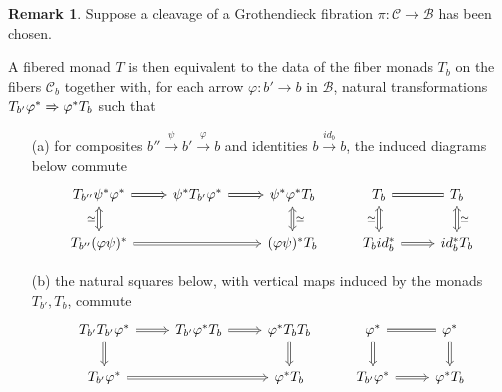 \documentclass[a4paper,10pt
,draft
]{article}%
\numberwithin{equation}{section}
\numberwithin{figure}{section}
\theoremstyle{definition} %
\newtheorem{remark}[equation]{Remark}%
\newcommand{\1}{\ensuremath{\mathbbm 1}}%
\begin{document}
\begin{remark}\label{FIBMONCL REM}
	Suppose a cleavage of a Grothendieck fibration
	$\pi \colon \mathcal{C} \to \mathcal{B}$ 
	has been chosen.
	
	A fibered monad $T$ is then equivalent to the data of the fiber monads 
	$T_b$ on the fibers $\mathcal{C}_b$ together with,
	for each arrow $\varphi \colon b' \to b$ in $\mathcal{B}$,
	natural transformations
	$T_{b'} \varphi^{\**} \Rightarrow \varphi^{\**} T_{b}$
	such that
	\begin{itemize}
		\item[(a)]
		for composites $b'' \xrightarrow{\psi} b' \xrightarrow{\varphi} b$
		and identities $b \xrightarrow{id_b} b$,
		the induced diagrams below commute
		\begin{equation}\label{GROTHASS EQ}
		\begin{tikzcd}
		T_{b''} \psi^{\**} \varphi^{\**} 
		\ar[Rightarrow]{r} \ar[Leftrightarrow]{d}[swap]{\simeq} &
		\psi^{\**} T_{b'} \varphi^{\**} \ar[Rightarrow]{r} &
		\psi^{\**} \varphi^{\**}  T_{b} \ar[Leftrightarrow]{d}{\simeq} &
		T_b \ar[equal]{r} \ar[Leftrightarrow]{d}[swap]{\simeq} &
		T_b \ar[Leftrightarrow]{d}{\simeq}
		\\
		T_{b''} (\varphi \psi)^{\**} \ar[Rightarrow]{rr}{} &&
		(\varphi \psi)^{\**} T_{b} &
		T_b id_b^{\**} \ar[Rightarrow]{r}{} &
		id_b^{\**} T_{b}
		\end{tikzcd}
		\end{equation}
		\item[(b)] the natural squares below,
		with vertical maps induced by the monads $T_{b'},T_b$, commute 
		\begin{equation}\label{GROTHCART EQ}
		\begin{tikzcd}
		T_{b'} T_{b'} \varphi^{\**} \ar[Rightarrow]{r} \ar[Rightarrow]{d}[swap]{} &
		T_{b'} \varphi^{\**} T_{b} \ar[Rightarrow]{r} &
		\varphi^{\**} T_{b} T_{b} \ar[Rightarrow]{d}{} &
		\varphi^{\**} \ar[equal]{r} \ar[Rightarrow]{d}&
		\varphi^{\**} \ar[Rightarrow]{d}
		\\
		T_{b'} \varphi^{\**} \ar[Rightarrow]{rr}{} &&
		\varphi^{\**} T_{b} &
		T_{b'} \varphi^{\**} \ar[Rightarrow]{r}{} &
		\varphi^{\**} T_{b}
		\end{tikzcd}
		\end{equation}
	\end{itemize}
\end{remark}
\end{document}
